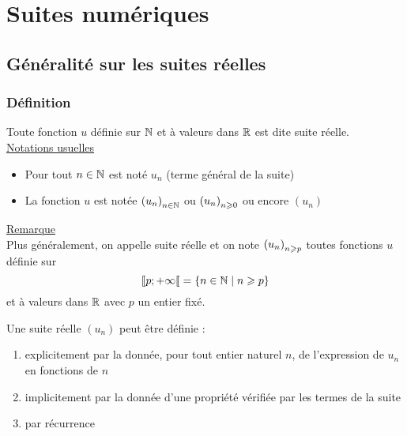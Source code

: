 \chapter{Suites numériques}

\minitoc

\section{Généralité sur les suites réelles}
\subsection{Définition}
\begin{defprop}
    Toute fonction \(u\) définie sur \(\mathbb{N}\) et à valeurs dans \(\mathbb{R}\) est dite suite réelle.\\
    \underline{Notations usuelles}\\
    \begin{itemize}
        \item Pour tout \(n \in \mathbb{N}\) est noté \(u_n\) (terme général de la suite)
        \item La fonction \(u\) est notée \(\left(u_n\right)_{n \in \mathbb{N}}\) ou \(\left(u_n\right)_{n \geqslant 0}\) ou encore \((u_n)\)
    \end{itemize}
    \underline{Remarque}\\
    Plus généralement, on appelle suite réelle et on note \(\left(u_n\right)_{n\geqslant p}\) toutes fonctions \(u\) définie sur 
    \[
    \left\llbracket p;+\infty\right\llbracket = \left\lbrace n \in \mathbb{N} \;\middle|\; n \geqslant p\right\rbrace
    \]
    et à valeurs dans \(\mathbb{R}\) avec \(p\) un entier fixé.
\end{defprop}

\begin{defprop}
    Une suite réelle \((u_n)\) peut être définie : 
    \begin{enumerate}
        \item explicitement par la donnée, pour tout entier naturel \(n\), de l'expression de \(u_n\) en fonctions de \(n\)\\
        \item implicitement par la donnée d'une propriété vérifiée par les termes de la suite \\
        \item par récurrence
    \end{enumerate}
\end{defprop}

